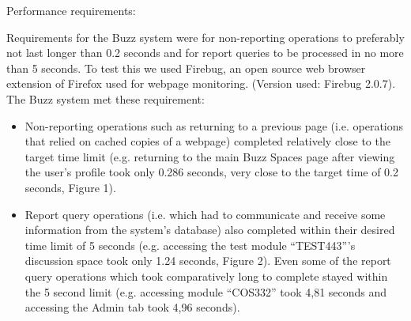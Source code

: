 \item Performance requirements:

Requirements for the Buzz system were for non-reporting operations to preferably not last longer than 0.2 seconds and for report queries to be processed in no more than 5 seconds.
To test this we used Firebug, an open source web browser extension of Firefox used for webpage monitoring. (Version used: Firebug 2.0.7).
The Buzz system met these requirement:
\begin{itemize}
\item Non-reporting operations such as returning to a previous page (i.e. operations that relied on cached copies of a webpage) completed relatively close to the target time limit (e.g. returning to the main Buzz Spaces page after viewing the user’s profile took only 0.286 seconds, very close to the target time of 0.2 seconds, Figure 1).
\item Report query operations (i.e. which had to communicate and receive some information from the system’s database) also completed within their desired time limit of 5 seconds (e.g. accessing the test module “TEST443”’s discussion space took only 1.24 seconds, Figure 2). Even some of the report query operations which took comparatively long to complete stayed within the 5 second limit (e.g. accessing module “COS332” took 4,81 seconds and accessing the Admin tab took 4,96 seconds).
\end{itemize}	
